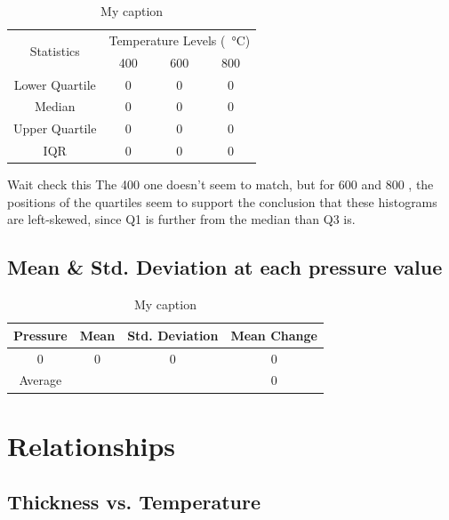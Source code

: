\documentclass[letterpaper]{article}
\begin{document}
    \begin{table}[H]
    \centering
    \begin{tabular}{c|c|c|c|}
    \multirow{2}{*}{Statistics} & \multicolumn{3}{c|}{Temperature Levels (\SI{}{\celsius})} \\ \cline{2-4}
                                & 400           & 600          & 800          \\ \hline
    Lower Quartile              & 0             & 0            & 0            \\ \hline
    Median                      & 0             & 0            & 0            \\ \hline
    Upper Quartile              & 0             & 0            & 0            \\ \hline
    IQR                         & 0             & 0            & 0            \\ \hline
    \end{tabular}
    \caption{My caption}
    \label{tempquart}
    \end{table}

    Wait check this
    The 400  one doesn’t seem to match, but for 600  and 800 , the positions of the quartiles seem to support the conclusion that these histograms are left-skewed, since Q1 is further from the median than Q3 is.
  \subsection{Mean \& Std. Deviation at each pressure value}

    \begin{table}[H]
    \centering
    \begin{tabular}{c|c|c|c|}
    Pressure & Mean & Std. Deviation & Mean Change \\ \hline
    0        & 0    & 0              & 0           \\ \hline
    Average  &      &                & 0           \\ \hline
    \end{tabular}
    \caption{My caption}
    \label{pressurestat}
    \end{table}

\section{Relationships}

  \subsection{Thickness vs. Temperature}
\end{document}
